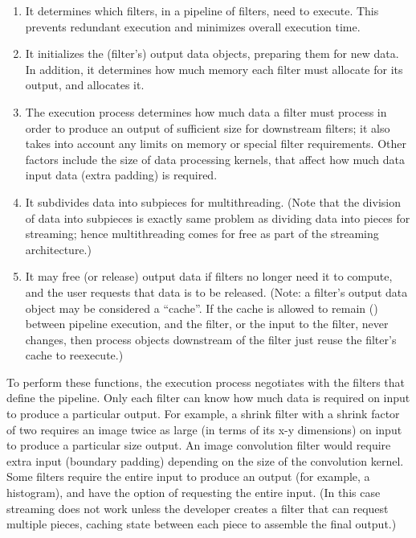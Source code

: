 \begin{enumerate}
        \item It determines which filters, in a pipeline of filters, need to
        execute. This prevents redundant execution and minimizes overall
        execution time.

        \item It initializes the (filter's) output data objects, preparing
        them for new data.  In addition, it determines how much memory each
        filter must allocate for its output, and allocates it.

        \item The execution process determines how much data a filter must
        process in order to produce an output of sufficient size for
        downstream filters; it also takes into account any limits on memory
        or special filter requirements. Other factors include the size of
        data processing kernels, that affect how much data input data 
        (extra padding) is required.

        \item It subdivides data into subpieces for multithreading. (Note
        that the division of data into subpieces is exactly same problem as
        dividing data into pieces for streaming; hence multithreading comes
        for free as part of the streaming architecture.)

        \item It may free (or release) output data if filters no longer need
        it to compute, and the user requests that data is to be
        released. (Note: a filter's output data object may be considered a
        ``cache''. If the cache is allowed to remain () 
        between pipeline execution, and the filter, or the input to the 
        filter, never changes, then process objects downstream of the filter 
        just reuse the filter's cache to reexecute.)
\end{enumerate}

To perform these functions, the execution process negotiates with the
filters that define the pipeline. Only each filter can know how much data is
required on input to produce a particular output. For example, a shrink
filter with a shrink factor of two requires an image twice as large (in terms
of its x-y dimensions) on input to produce a particular size output. An
image convolution filter would require extra input (boundary padding)
depending on the size of the convolution kernel. Some filters require the
entire input to produce an output (for example, a histogram), and have the
option of requesting the entire input. (In this case streaming does not work
unless the developer creates a filter that can request multiple pieces,
caching state between each piece to assemble the final output.)


